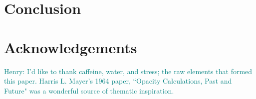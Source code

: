\documentclass{sig-alternate}
\newcommand{\allcomments}[1]{{#1}}
\newcommand{\hfcomment}[1]{\textcolor{Teal}{\allcomments{Henry: {#1}}}}
\begin{document}
\section{Conclusion}
\label{conclusion}

\section{Acknowledgements}
\hfcomment{I'd like to thank caffeine, water, and stress; the raw elements that formed this paper. Harris L. Mayer's 1964 paper, ``Opacity Calculations, Past and Future" was a wonderful source of thematic inspiration.}


  

\end{document}

